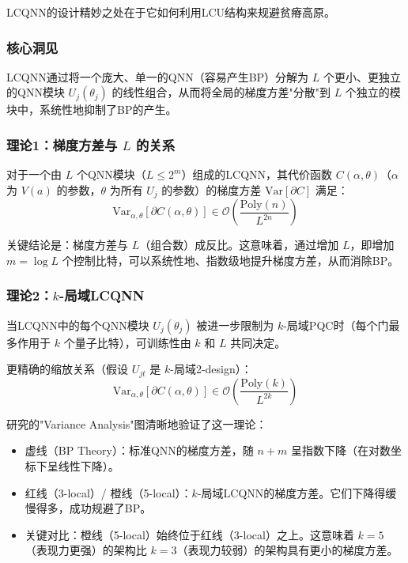 \documentclass[12pt,a4paper]{article}
\begin{document}
LCQNN的设计精妙之处在于它如何利用LCU结构来规避贫瘠高原。

\subsubsection{核心洞见}

LCQNN通过将一个庞大、单一的QNN（容易产生BP）分解为 $L$ 个更小、更独立的QNN模块 $U_j(\theta_j)$ 的线性组合，从而将全局的梯度方差"分散"到 $L$ 个独立的模块中，系统性地抑制了BP的产生。

\subsubsection{理论1：梯度方差与 $L$ 的关系}

对于一个由 $L$ 个QNN模块（$L \le 2^m$）组成的LCQNN，其代价函数 $C(\alpha, \theta)$（$\alpha$ 为 $V(a)$ 的参数，$\theta$ 为所有 $U_j$ 的参数）的梯度方差 $\text{Var}[\partial C]$ 满足：
\begin{equation}
\text{Var}_{\alpha, \theta}[\partial C(\alpha, \theta)] \in \mathcal{O}\left(\frac{\text{Poly}(n)}{L^{2n}}\right)
\end{equation}

关键结论是：梯度方差与 $L$（组合数）成反比。这意味着，通过增加 $L$，即增加 $m = \log L$ 个控制比特，可以系统性地、指数级地提升梯度方差，从而消除BP。

\subsubsection{理论2：$k$-局域LCQNN}

当LCQNN中的每个QNN模块 $U_j(\theta_j)$ 被进一步限制为 $k$-局域PQC时（每个门最多作用于 $k$ 个量子比特），可训练性由 $k$ 和 $L$ 共同决定。

更精确的缩放关系（假设 $U_{jt}$ 是 $k$-局域2-design）：
\begin{equation}
\text{Var}_{\alpha, \theta}[\partial C(\alpha, \theta)] \in \mathcal{O}\left(\frac{\text{Poly}(k)}{L^{2k}}\right)
\end{equation}

研究的"Variance Analysis"图清晰地验证了这一理论：
\begin{itemize}
\item 虚线（BP Theory）：标准QNN的梯度方差，随 $n+m$ 呈指数下降（在对数坐标下呈线性下降）。
\item 红线（3-local）/ 橙线（5-local）：$k$-局域LCQNN的梯度方差。它们下降得缓慢得多，成功规避了BP。
\item 关键对比：橙线（5-local）始终位于红线（3-local）之上。这意味着 $k=5$（表现力更强）的架构比 $k=3$（表现力较弱）的架构具有更小的梯度方差。
\end{itemize}
\end{document}
